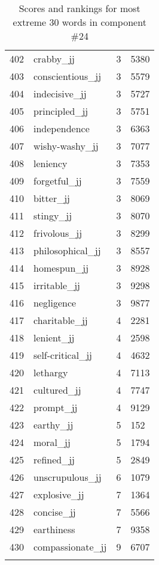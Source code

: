 \begin{longtable}[!htbp]{| rlr@{.}l |}
    402 & crabby\_jj & 3 & 5380 \\
    403 & conscientious\_jj & 3 & 5579 \\
    404 & indecisive\_jj & 3 & 5727 \\
    405 & principled\_jj & 3 & 5751 \\
    406 & independence & 3 & 6363 \\
    407 & wishy-washy\_jj & 3 & 7077 \\
    408 & leniency & 3 & 7353 \\
    409 & forgetful\_jj & 3 & 7559 \\
    410 & bitter\_jj & 3 & 8069 \\
    411 & stingy\_jj & 3 & 8070 \\
    412 & frivolous\_jj & 3 & 8299 \\
    413 & philosophical\_jj & 3 & 8557 \\
    414 & homespun\_jj & 3 & 8928 \\
    415 & irritable\_jj & 3 & 9298 \\
    416 & negligence & 3 & 9877 \\
    417 & charitable\_jj & 4 & 2281 \\
    418 & lenient\_jj & 4 & 2598 \\
    419 & self-critical\_jj & 4 & 4632 \\
    420 & lethargy & 4 & 7113 \\
    421 & cultured\_jj & 4 & 7747 \\
    422 & prompt\_jj & 4 & 9129 \\
    423 & earthy\_jj & 5 & 152 \\
    424 & moral\_jj & 5 & 1794 \\
    425 & refined\_jj & 5 & 2849 \\
    426 & unscrupulous\_jj & 6 & 1079 \\
    427 & explosive\_jj & 7 & 1364 \\
    428 & concise\_jj & 7 & 5566 \\
    429 & earthiness & 7 & 9358 \\
    430 & compassionate\_jj & 9 & 6707 \\
    \hline
    \caption{Scores and rankings for most extreme 30 words in component \#24} \\
\end{longtable}
